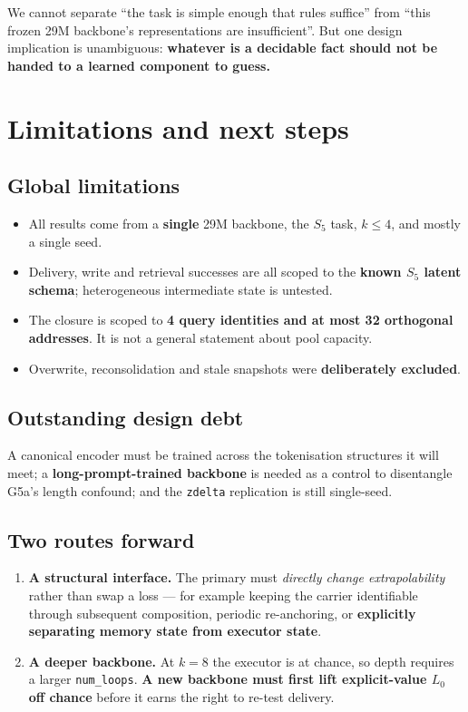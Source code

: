 \documentclass[11pt, a4paper]{article}
\begin{document}
We cannot separate ``the task is simple enough that rules suffice'' from ``this frozen 29M
backbone's representations are insufficient''. But one design implication is unambiguous:
\textbf{whatever is a decidable fact should not be handed to a learned component to guess.}

\section{Limitations and next steps}

\subsection{Global limitations}

\begin{itemize}
\item All results come from a \textbf{single} 29M backbone, the $S_5$ task, $k \le 4$, and
mostly a single seed.
\item Delivery, write and retrieval successes are all scoped to the \textbf{known $S_5$
latent schema}; heterogeneous intermediate state is untested.
\item The closure is scoped to \textbf{4 query identities and at most 32 orthogonal
addresses}. It is not a general statement about pool capacity.
\item Overwrite, reconsolidation and stale snapshots were \textbf{deliberately excluded}.
\end{itemize}

\subsection{Outstanding design debt}

A canonical encoder must be trained across the tokenisation structures it will meet; a
\textbf{long-prompt-trained backbone} is needed as a control to disentangle G5a's length
confound; and the \verb|zdelta| replication is still single-seed.

\subsection{Two routes forward}

\begin{enumerate}
\item \textbf{A structural interface.} The primary must \emph{directly change
extrapolability} rather than swap a loss --- for example keeping the carrier identifiable
through subsequent composition, periodic re-anchoring, or \textbf{explicitly separating
memory state from executor state}.
\item \textbf{A deeper backbone.} At $k{=}8$ the executor is at chance, so depth requires a
larger \verb|num_loops|. \textbf{A new backbone must first lift explicit-value $L_0$ off
chance} before it earns the right to re-test delivery.
\end{enumerate}
\end{document}
